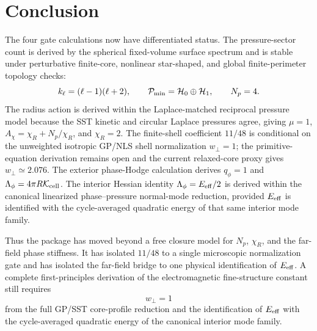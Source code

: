\documentclass[11pt]{article}
\begin{document}
\section{Conclusion}

The four gate calculations now have differentiated status.  The pressure-sector
count is derived by the spherical fixed-volume surface spectrum and is stable
under perturbative finite-core, nonlinear star-shaped, and global
finite-perimeter topology checks:
\[
  k_\ell=(\ell-1)(\ell+2),
  \qquad
  \mathcal P_{\rm min}=\mathcal H_0\oplus\mathcal H_1,
  \qquad
  N_p=4.
\]
The radius action is derived within the Laplace-matched reciprocal pressure
model because the SST kinetic and circular Laplace pressures agree, giving
\(\mu=1\), \(A_\chi=\chi_R+N_p/\chi_R\), and \(\chi_R=2\).  The finite-shell
coefficient \(11/48\) is conditional on the unweighted isotropic GP/NLS shell
normalization \(w_\perp=1\); the primitive-equation derivation remains open and
the current relaxed-core proxy gives \(w_\perp\simeq2.076\).
The exterior phase-Hodge calculation derives \(q_\phi=1\) and
\(\Lambda_\phi=4\pi R\mathcal K_{\rm cell}\).  The interior Hessian identity
\(\Lambda_\phi=E_{\rm eff}/2\) is derived within the canonical linearized
phase--pressure normal-mode reduction, provided \(E_{\rm eff}\) is identified
with the cycle-averaged quadratic energy of that same interior mode family.

Thus the package has moved beyond a free closure model for \(N_p\),
\(\chi_R\), and the far-field phase stiffness.  It has isolated \(11/48\) to a
single microscopic normalization gate and has isolated the far-field bridge to
one physical identification of \(E_{\rm eff}\).  A complete first-principles
derivation of the electromagnetic fine-structure constant still requires
\[
  w_\perp=1
\]
from the full GP/SST core-profile reduction and the identification of
\(E_{\rm eff}\) with the cycle-averaged quadratic energy of the canonical
interior mode family.
\end{document}
